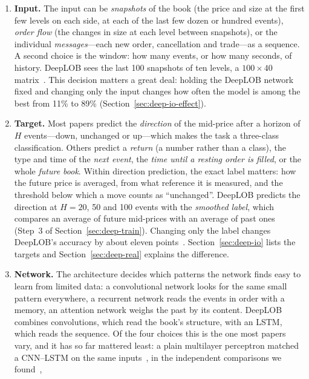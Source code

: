 \begin{enumerate}[leftmargin=1.8em,itemsep=4pt]
\item \textbf{Input.} The input can be \emph{snapshots} of the book (the price and size at the first
  few levels on each side, at each of the last few dozen or hundred events), \emph{order flow} (the changes in size at
  each level between snapshots), or the individual \emph{messages}---each new order, cancellation and trade---as a
  sequence. A second choice is the window: how many events, or how many seconds, of history. DeepLOB sees the last 100
  snapshots of ten levels, a $100 \times 40$ matrix~\citep{zhang2019}. This decision matters a great deal: holding the
  DeepLOB network fixed and changing only the input changes how often the model is among the best from 11\% to
  89\% (Section~\ref{sec:deep-io-effect}).
\item \textbf{Target.} Most papers predict the \emph{direction} of the mid-price after a horizon
  of $H$ events---down, unchanged or up---which makes the task a three-class classification. Others predict a
  \emph{return} (a number rather than a class), the type and time of the \emph{next event}, the \emph{time until a
  resting order is filled}, or the whole \emph{future book}. Within direction prediction, the exact label matters: how
  the future price is averaged, from what reference it is measured, and the threshold below which a move counts as
  ``unchanged''. DeepLOB predicts the direction at $H = 20$, 50 and 100 events with the \emph{smoothed label}, which
  compares an average of future mid-prices with an average of past ones (Step~3 of Section~\ref{sec:deep-train}). Changing only the label changes DeepLOB's
  accuracy by about eleven points~\citep{lee2024predictability}. Section~\ref{sec:deep-io} lists the targets and Section~\ref{sec:deep-real}
  explains the difference.
\item \textbf{Network.} The architecture decides which patterns the network finds easy to learn from
  limited data: a convolutional network looks for the same small pattern everywhere, a recurrent network reads the
  events in order with a memory, an attention network weighs the past by its content. DeepLOB combines convolutions,
  which read the book's structure, with an LSTM, which reads the sequence. Of the four choices this is the one most
  papers vary, and it has so far mattered least: a plain multilayer perceptron matched a CNN--LSTM on the same
  inputs~\citep{briola2020}, in the independent comparisons we found~\citep{bilokon2023transformers,zhong2025lobench},

\end{enumerate}
